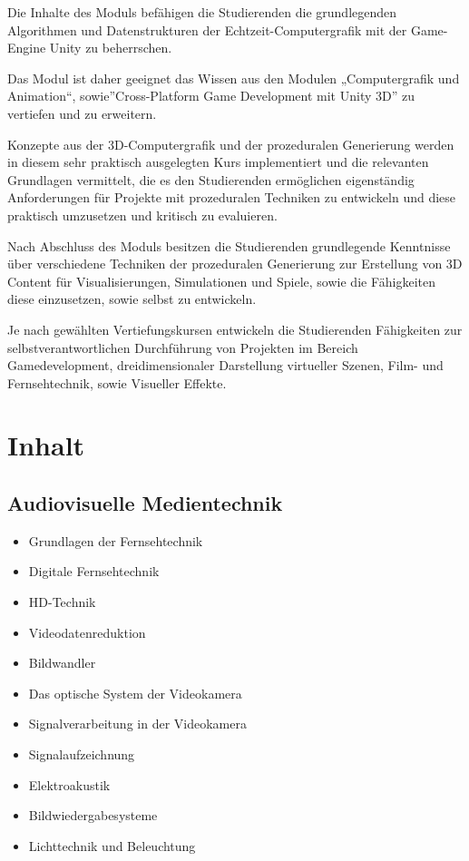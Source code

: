 Die Inhalte des Moduls befähigen die Studierenden die grundlegenden
Algorithmen und Datenstrukturen der Echtzeit-Computergrafik mit der
Game-Engine Unity zu beherrschen.

Das Modul ist daher geeignet das Wissen aus den Modulen „Computergrafik
und Animation``, sowie''Cross-Platform Game Development mit Unity 3D''
zu vertiefen und zu erweitern.

Konzepte aus der 3D-Computergrafik und der prozeduralen Generierung
werden in diesem sehr praktisch ausgelegten Kurs implementiert und die
relevanten Grundlagen vermittelt, die es den Studierenden ermöglichen
eigenständig Anforderungen für Projekte mit prozeduralen Techniken zu
entwickeln und diese praktisch umzusetzen und kritisch zu evaluieren.

Nach Abschluss des Moduls besitzen die Studierenden grundlegende
Kenntnisse über verschiedene Techniken der prozeduralen Generierung zur
Erstellung von 3D Content für Visualisierungen, Simulationen und Spiele,
sowie die Fähigkeiten diese einzusetzen, sowie selbst zu entwickeln.

Je nach gewählten Vertiefungskursen entwickeln die Studierenden
Fähigkeiten zur selbstverantwortlichen Durchführung von Projekten im
Bereich Gamedevelopment, dreidimensionaler Darstellung virtueller
Szenen, Film- und Fernsehtechnik, sowie Visueller Effekte.

\section*{Inhalt\label{/mi-2017/modulbeschreibungen-bachelor/BA_Vertiefung-Visual-Computing}}\label{inhaltpathlabelmi-2017modulbeschreibungen-bachelorbaux5fvertiefung-visual-computing}

\subsection*{Audiovisuelle
Medientechnik\label{/mi-2017/modulbeschreibungen-bachelor/BA_Vertiefung-Visual-Computing}}\label{audiovisuelle-medientechnikpathlabelmi-2017modulbeschreibungen-bachelorbaux5fvertiefung-visual-computing-2}

\begin{itemize}
\tightlist
\item
  Grundlagen der Fernsehtechnik
\item
  Digitale Fernsehtechnik
\item
  HD-Technik
\item
  Videodatenreduktion
\item
  Bildwandler
\item
  Das optische System der Videokamera
\item
  Signalverarbeitung in der Videokamera
\item
  Signalaufzeichnung
\item
  Elektroakustik
\item
  Bildwiedergabesysteme
\item
  Lichttechnik und Beleuchtung
\end{itemize}

